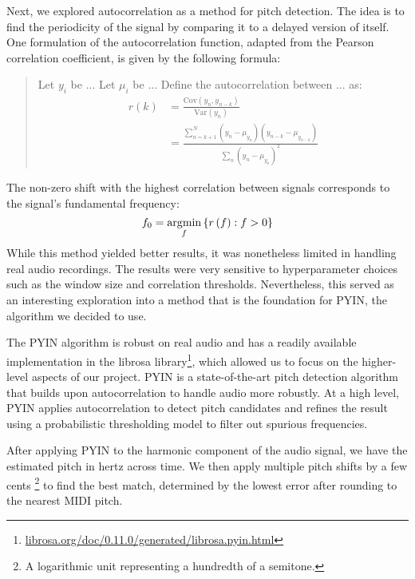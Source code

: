 
Next, we explored autocorrelation as a method for pitch detection. The idea is to find the periodicity of the signal by comparing it to a delayed version of itself. One formulation of the autocorrelation function, adapted from the Pearson correlation coefficient, is given by the following formula:
\begin{quote}
    Let $y_i$ be ... Let $\mu_i$ be ...
    Define the autocorrelation between ... as:
    \begin{align*}
        r\left(k\right)
        &= \frac{\text{Cov}\left(y_n, y_{n-k}\right)}{\text{Var}\left(y_n\right)} \\
        &= \frac{\sum_{n=k+1}^N \left(y_n - \mu_{y_n}\right) \left(y_{n-k} - \mu_{y_{n-k}}\right)}{\sum_n \left(y_n - \mu_{y_n}\right)^2}
    \end{align*}
\end{quote}
The non-zero shift with the highest correlation between signals corresponds to the signal's fundamental frequency:
$$f_0 = \operatorname*{\arg\!\min}_{f}\left\{ r\left(f\right) : f > 0 \right\}$$
While this method yielded better results, it was nonetheless limited in handling real audio recordings. The results were very sensitive to hyperparameter choices such as the window size and correlation thresholds. Nevertheless, this served as an interesting exploration into a method that is the foundation for PYIN, the algorithm we decided to use.


The PYIN algorithm \autocite{PYIN:2014} is robust on real audio and has a readily available implementation in the librosa library\footnote{\href{https://librosa.org/doc/0.11.0/generated/librosa.pyin.html}{librosa.org/doc/0.11.0/generated/librosa.pyin.html}}, which allowed us to focus on the higher-level aspects of our project. PYIN is a state-of-the-art pitch detection algorithm that builds upon autocorrelation to handle audio more robustly. At a high level, PYIN applies autocorrelation to detect pitch candidates and refines the result using a probabilistic thresholding model to filter out spurious frequencies.

After applying PYIN to the harmonic component of the audio signal, we have the estimated pitch in hertz across time. We then apply multiple pitch shifts by a few cents \footnote{A logarithmic unit representing a hundredth of a semitone.} to find the best match, determined by the lowest error after rounding to the nearest MIDI pitch.

